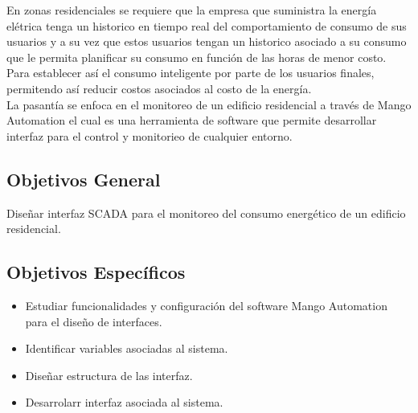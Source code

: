 
    En zonas residenciales se requiere que la empresa que suministra la energía elétrica tenga un historico en tiempo real 
    del comportamiento de consumo de sus usuarios y a su vez que estos usuarios tengan un historico asociado a su consumo 
    que le permita planificar su consumo en función de las horas de menor costo. Para establecer así el consumo inteligente 
    por parte de los usuarios finales, permitendo así reducir costos asociados al costo de la energía.\\
        
    La pasantía se enfoca en el monitoreo de un edificio residencial a través de Mango Automation el cual es una herramienta
    de software que permite desarrollar interfaz para el control y monitorieo de cualquier entorno.

\subsection{Objetivos General}
    Diseñar interfaz SCADA para el 
    monitoreo del consumo energético de un 
    edificio residencial.

\subsection{Objetivos Específicos}
\begin{itemize}
    \item Estudiar funcionalidades y configuración
    del software Mango Automation para el diseño de 
    interfaces.
    \item Identificar variables asociadas al sistema.
    \item Diseñar estructura de las interfaz.
    \item Desarrolarr interfaz asociada al sistema.
\end{itemize}
\newpage